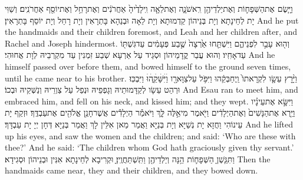 {וַיָּ֧שֶׂם אֶת\maqqaf הַשְּׁפָח֛וֹת וְאֶת\maqqaf יַלְדֵיהֶ֖ן רִֽאשֹׁנָ֑ה וְאֶת\maqqaf לֵאָ֤ה וִֽילָדֶ֙יהָ֙ אַחֲרֹנִ֔ים וְאֶת\maqqaf רָחֵ֥ל וְאֶת\maqqaf יוֹסֵ֖ף אַחֲרֹנִֽים׃}
{וְשַׁוִּי יָת לְחֵינָתָא וְיָת בְּנֵיהוֹן קַדְמוּתָא וְיָת לֵאָה וּבְנַהָא בָּתְרָאִין וְיָת רָחֵל וְיָת יוֹסֵף בָּתְרָאִין׃}
{And he put the handmaids and their children foremost, and Leah and her children after, and Rachel and Joseph hindermost.}{}
{וְה֖וּא עָבַ֣ר לִפְנֵיהֶ֑ם וַיִּשְׁתַּ֤חוּ אַ֙רְצָה֙ שֶׁ֣בַע פְּעָמִ֔ים עַד\maqqaf גִּשְׁתּ֖וֹ עַד\maqqaf אָחִֽיו׃}
{וְהוּא עֲבַר קֳדָמֵיהוֹן וּסְגֵיד עַל אַרְעָא שְׁבַע זִמְנִין עַד מִקְרְבֵיהּ לְוָת אֲחוּהִי׃}
{And he himself passed over before them, and bowed himself to the ground seven times, until he came near to his brother.}{}
{וַיָּ֨רׇץ עֵשָׂ֤ו לִקְרָאתוֹ֙ וַֽיְחַבְּקֵ֔הוּ וַיִּפֹּ֥ל עַל\maqqaf צַוָּארָ֖ו וַׄיִּׄשָּׁׄקֵ֑ׄהׄוּׄ וַיִּבְכּֽוּ׃}
{וּרְהַט עֵשָׂו לְקַדָּמוּתֵיהּ וְגָפְפֵיהּ וּנְפַל עַל צַוְרֵיהּ וְנַשְּׁקֵיהּ וּבְכוֹ׃}
{And Esau ran to meet him, and embraced him, and fell on his neck, and kissed him; and they wept.}{}
{וַיִּשָּׂ֣א אֶת\maqqaf עֵינָ֗יו וַיַּ֤רְא אֶת\maqqaf הַנָּשִׁים֙ וְאֶת\maqqaf הַיְלָדִ֔ים וַיֹּ֖אמֶר מִי\maqqaf אֵ֣לֶּה לָּ֑ךְ וַיֹּאמַ֕ר הַיְלָדִ֕ים אֲשֶׁר\maqqaf חָנַ֥ן אֱלֹהִ֖ים אֶת\maqqaf עַבְדֶּֽךָ׃}
{וּזְקַף יָת עֵינוֹהִי וַחֲזָא יָת נְשַׁיָּא וְיָת בְּנַיָּא וַאֲמַר מַאן אִלֵּין לָךְ וַאֲמַר בְּנַיָּא דְּחָן יְיָ יָת עַבְדָּךְ׃}
{And he lifted up his eyes, and saw the women and the children; and said: ‘Who are these with thee?’ And he said: ‘The children whom God hath graciously given thy servant.’}{}
{וַתִּגַּ֧שְׁןָ הַשְּׁפָח֛וֹת הֵ֥נָּה וְיַלְדֵיהֶ֖ן וַתִּֽשְׁתַּחֲוֶֽיןָ׃}
{וּקְרִיבָא לְחֵינָתָא אִנִּין וּבְנֵיהוֹן וּסְגִידָא׃}
{Then the handmaids came near, they and their children, and they bowed down.}{}
